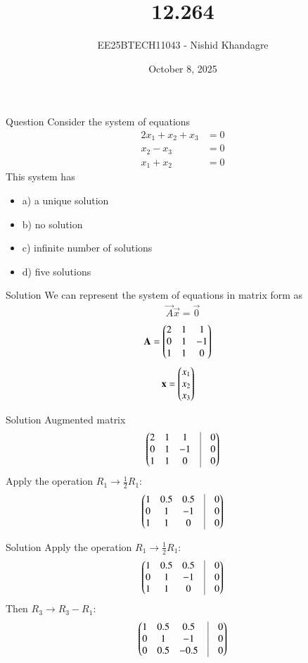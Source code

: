 \documentclass{beamer}
\title{12.264}
\date{October 8, 2025}
\author{EE25BTECH11043 - Nishid Khandagre}
\begin{document}
\frame{\titlepage}

\begin{frame}{Question}
Consider the system of equations
\begin{align*}
2x_1 + x_2 + x_3 &= 0 \\
x_2 - x_3 &= 0 \\
x_1 + x_2 &= 0
\end{align*}
This system has
\begin{itemize}
\item a) a unique solution
\item b) no solution
\item c) infinite number of solutions
\item d) five solutions
\end{itemize}
\end{frame}

\begin{frame}{Solution}
We can represent the system of equations in matrix form as 
\begin{align}
\vec{A}\vec{x} = \vec{0}
\end{align}
\begin{align}
\mathbf{A} &= \begin{pmatrix}
2 & 1 & 1 \\
0 & 1 & -1 \\
1 & 1 & 0
\end{pmatrix}
\end{align}
\begin{align}
\mathbf{x} &= \begin{pmatrix}
x_1 \\ x_2 \\ x_3
\end{pmatrix}
\end{align}
\end{frame}

\begin{frame}{Solution}
Augmented matrix
\begin{align}
\myvec{
2 & 1 & 1 & \vrule & 0 \\
0 & 1 & -1 & \vrule & 0 \\
1 & 1 & 0 & \vrule & 0
}
\end{align}
Apply the operation $R_1 \rightarrow \frac{1}{2}R_1$:
\begin{align}
\myvec{
1 & 0.5 & 0.5 & \vrule & 0 \\
0 & 1 & -1 & \vrule & 0 \\
1 & 1 & 0 & \vrule & 0
}
\end{align}
\end{frame}

\begin{frame}{Solution}
Apply the operation $R_1 \rightarrow \frac{1}{2}R_1$:
\begin{align}
\myvec{
1 & 0.5 & 0.5 & \vrule & 0 \\
0 & 1 & -1 & \vrule & 0 \\
1 & 1 & 0 & \vrule & 0
}
\end{align}
Then $R_3 \rightarrow R_3 - R_1$:
\begin{align}
\myvec{
1 & 0.5 & 0.5 & \vrule & 0 \\
0 & 1 & -1 & \vrule & 0 \\
0 & 0.5 & -0.5 & \vrule & 0
}
\end{align}
\end{frame}
\end{document}
